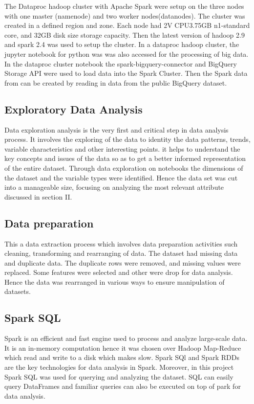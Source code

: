 \documentclass[12pt,letterpaper, twoside]{article}
\begin{document}
The Dataproc hadoop cluster with Apache Spark were setup on the three nodes with one master (namenode) and two worker nodes(datanodes). The cluster was created in a defined region and zone. Each node had 2V CPU3.75GB n1-standard core, and 32GB disk size storage capacity. Then the latest version of hadoop 2.9 and spark 2.4 was used to setup the cluster. In a dataproc hadoop cluster, the jupyter notebook for python was was also accessed for the processing of big data.  In the dataproc cluster notebook the spark-bigquery-connector and BigQuery Storage API were used to  load data into the Spark Cluster. Then the Spark data from can be created by reading in data from the public BigQuery dataset. 

\subsection{ Exploratory Data Analysis}
Data exploration analysis is the very first and critical step in data analysis process. It involves the exploring of the data to identity the data patterns, trends, variable characteristics and other interesting points. it helps to understand the key concepts and issues of the data so as to get a better informed representation of the entire dataset. Through data exploration on notebooks the dimensions of the dataset and the variable types were identified. Hence the data set was cut into a manageable size, focusing on analyzing the most relevant attribute discussed in section II. 

\subsection{Data preparation}
 This a data extraction process which involves data preparation activities such cleaning, transforming and rearranging of data. The dataset had missing data and duplicate data. The duplicate rows were removed, and missing values were replaced. Some features were selected and other were drop for data analysis. Hence the data was rearranged in various ways to ensure  manipulation of datasets. 


\subsection{Spark SQL}
Spark is an efficient and fast engine used to process and analyze large-scale data. It is an in-memory computation hence it was chosen over Hadoop Map-Reduce which read  and write to a disk which makes slow. Spark SQl and Spark RDDs are the key technologies for data analysis in Spark. Moreover, in this project Spark SQL was used for querying  and analyzing the dataset. SQL can easily  query DataFrames and familiar queries can also be executed on top of park for data analysis.
\end{document}
